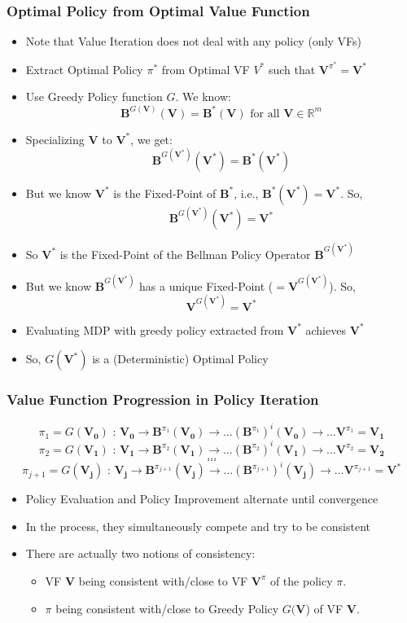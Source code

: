 \documentclass[handout]{beamer}
\newcommand{\bvpi}{\bm{V}^{\pi}}
\newcommand{\bvs}{\bm{V}^*}
\newcommand{\bbs}{\bm{B}^*}
\newcommand{\bv}{\bm{V}}
\begin{document}
\begin{frame}
\frametitle{Optimal Policy from Optimal Value Function}
\pause
\begin{itemize}[<+->]
\item Note that Value Iteration does not deal with any policy (only VFs)
\item Extract Optimal Policy $\pi^*$ from Optimal VF $V^*$ such that $\bm{V}^{\pi^*} = \bvs$
\item Use Greedy Policy function $G$. We know:
$$\bm{B}^{G(\bv)}(\bv) = \bbs(\bv) \text{ for all } \bv \in \mathbb{R}^m$$
\item Specializing $\bv$ to $\bvs$, we get:
$$\bm{B}^{G(\bvs)}(\bvs) = \bbs(\bvs)$$ 
\item But we know $\bvs$ is the Fixed-Point of $\bbs$, i.e., $\bbs(\bvs) = \bvs$. So,
$$\bm{B}^{G(\bvs)}(\bvs) = \bvs$$ 
\item So $\bvs$ is the Fixed-Point of the Bellman Policy Operator $\bm{B}^{G(\bvs)}$
\item But we know $\bm{B}^{G(\bvs)}$ has a unique Fixed-Point ($=\bm{V}^{G(\bvs)}$). So,
$$\bm{V}^{G(\bvs)} = \bvs$$
\item Evaluating MDP with greedy policy extracted from $\bvs$ achieves $\bvs$
\item So, $G(\bvs)$ is a (Deterministic) Optimal Policy
\end{itemize}
\end{frame}


\begin{frame}
\frametitle{Value Function Progression in Policy Iteration}
\pause
$$\pi_1 = G(\bm{V_0}) \text{ : } \bm{V_0} \rightarrow \bm{B}^{\pi_1}(\bm{V_0}) \rightarrow \ldots (\bm{B}^{\pi_1})^i(\bm{V_0}) \rightarrow \ldots \bm{V}^{\pi_1} = \bm{V_1}$$
$$\pi_2 = G(\bm{V_1}) \text{ : }  \bm{V_1} \rightarrow \bm{B}^{\pi_2}(\bm{V_1}) \rightarrow \ldots (\bm{B}^{\pi_2})^i(\bm{V_1}) \rightarrow \ldots \bm{V}^{\pi_2} = \bm{V_2}$$
$$\ldots$$
$$\ldots$$
$$\pi_{j+1} = G(\bm{V_j}) \text{ : } \bm{V_j} \rightarrow \bm{B}^{\pi_{j+1}}(\bm{V_j}) \rightarrow \ldots (\bm{B}^{\pi_{j+1}})^i(\bm{V_j}) \rightarrow \ldots \bm{V}^{\pi_{j+1}} = \bvs$$
\pause
\begin{itemize}[<+->]
\item Policy Evaluation and Policy Improvement alternate until convergence
\item In the process, they simultaneously compete and try to be consistent
\item There are actually two notions of consistency:
\begin{itemize}
\item VF $\bv$ being consistent with/close to VF $\bvpi$ of the policy $\pi$.
\item $\pi$ being consistent with/close to Greedy Policy $G(\bv$) of VF $\bv$.
\end{itemize}
\end{itemize}
\end{frame}
\end{document}
